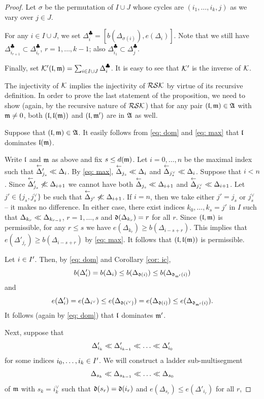 \documentclass{ert-l} %
\begin{document}
\begin{proof}
Let $\sigma$ be the permutation of $I\cup J$ whose cycles are $(i_1,\dots,i_k,j)$ as we vary over $j\in J$.

For any $i\in I\cup J$, we set $\Delta^{\clubsuit}_i=[b(\Delta_{\sigma(i)}),e(\Delta_i)]$.
Note that we still have $\Delta^{\clubsuit}_{i_{r+1}}\subset\Delta^{\clubsuit}_{i_r}$, $r=1,\dots,k-1$;
also $\Delta^{\clubsuit}_{i_1}\subset\Delta^{\clubsuit}_j$.

Finally, set $\mathcal{K'}(\mathfrak{l},\mathfrak{m})=\sum_{i\in I\cup J}\Delta^{\clubsuit}_i$. It is easy to see that $\mathcal{K'}$ is the inverse of $\mathcal{K}$.

The injectivity of $\mathcal{K}$ implies the injectivity of $\mathcal{RSK}$ by virtue of its recursive definition.
In order to prove the last statement of the proposition,
we need to show (again, by the recursive nature of $\mathcal{RSK}$) that for any pair $(\mathfrak{l},\mathfrak{m})\in\mathfrak{A}$ with $\mathfrak{m}\ne0$,
both $(\mathfrak{l},\mathfrak{l}(\mathfrak{m}))$ and $(\mathfrak{l},\mathfrak{m}')$ are in $\mathfrak{A}$ as well.

Suppose that $(\mathfrak{l},\mathfrak{m})\in\mathfrak{A}$.
It easily follows from \eqref{eq: dom} and \eqref{eq: max} that $\mathfrak{l}$ dominates $\mathfrak{l}(\mathfrak{m})$.

Write $\mathfrak{l}$ and $\mathfrak{m}$ as above and fix $s\le d(\mathfrak{m})$. Let $i=0,\dots,n$ be the maximal index such that $\lshft\Delta'_{j_s}\smlr\Delta_i$.
By \eqref{eq: max}, $\lshft\Delta_{j_s}\smlr\Delta_i$ and $\lshft\Delta_{j_s^\vee}\smlr\Delta_i$.
Suppose that $i<n$. Since $\lshft\Delta'_{j_s}\not\smlr\Delta_{i+1}$ we cannot have both
$\lshft\Delta_{j_s}\smlr\Delta_{i+1}$ and $\lshft\Delta_{j_s^\vee}\smlr\Delta_{i+1}$.
Let $j'\in\{j_s,j_s^\vee\}$ be such that $\lshft\Delta_{j'}\not\smlr\Delta_{i+1}$.
If $i=n$, then we take either $j'=j_s$ or $j_s^\vee$ -- it makes no difference.
In either case, there exist indices $k_0,\dots,k_s=j'$ in $I$ such that
$\Delta_{k_r}\ll\Delta_{k_{r-1}}$, $r=1,\dots,s$ and $\mathfrak{d}(\Delta_{k_r})=
r$ for all $r$.
Since $(\mathfrak{l},\mathfrak{m})$ is permissible, for any $r\le s$
we have $e(\Delta_{k_r})\ge b(\Delta_{i-s+r})$. This implies that
$e(\Delta'_{j_r})\ge b(\Delta_{i-s+r})$ by \eqref{eq: max}. It follows that $(\mathfrak{l},\mathfrak{l}(\mathfrak{m}))$ is permissible.

Let $i\in I'$.
Then, by \eqref{eq: dom} and Corollary \ref{cor: ic},
\[
b(\Delta'_i)=b(\Delta_i)\le b(\Delta_{\mathfrak{d}(i)})\le b(\Delta_{\mathfrak{d}_{\mathfrak{m}'}(i)})
\]
and
\[
e(\Delta'_i)=e(\Delta_{i^\vee})\le e(\Delta_{\mathfrak{d}(i^\vee)})=e(\Delta_{\mathfrak{d}(i)})\le e(\Delta_{\mathfrak{d}_{\mathfrak{m}'}(i)}).
\]
It follows (again by \eqref{eq: dom}) that $\mathfrak{l}$ dominates $\mathfrak{m}'$.


Next, suppose that
\[
\Delta'_{i_k}\smlr\Delta'_{i_{k-1}}\smlr\dots\smlr\Delta'_{i_0}
\]
for some indices $i_0,\dots,i_k\in I'$. We will construct a ladder sub-multisegment
\[
\Delta_{s_k}\smlr\Delta_{s_{k-1}}\smlr\dots\smlr\Delta_{s_0}
\]
of $\mathfrak{m}$ with $s_k=i_k^\vee$ such that $\mathfrak{d}(s_r)=\mathfrak{d}(i_r)$ and $e(\Delta_{s_r})\le e(\Delta'_{i_r})$ for all $r$,


\end{proof}
\end{document}
